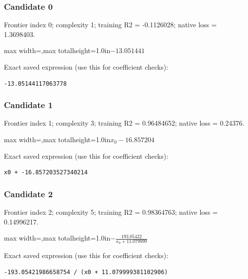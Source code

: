 \documentclass[10pt,letterpaper,landscape]{article}
\begin{document}
\subsubsection*{Candidate 0}
Frontier index 0; complexity 1; training R2 = -0.1126028; native loss = 1.3698403.
\begin{center}\begin{adjustbox}{max width=\linewidth,max totalheight=1.0in}$\displaystyle -13.051441$\end{adjustbox}\end{center}
{\scriptsize Exact saved expression (use this for coefficient checks):}
\begin{lstlisting}
-13.05144117063778
\end{lstlisting}
\subsubsection*{Candidate 1}
Frontier index 1; complexity 3; training R2 = 0.96484652; native loss = 0.24376.
\begin{center}\begin{adjustbox}{max width=\linewidth,max totalheight=1.0in}$\displaystyle x_{0} - 16.857204$\end{adjustbox}\end{center}
{\scriptsize Exact saved expression (use this for coefficient checks):}
\begin{lstlisting}
x0 + -16.857203527340214
\end{lstlisting}
\subsubsection*{Candidate 2}
Frontier index 2; complexity 5; training R2 = 0.98364763; native loss = 0.14996217.
\begin{center}\begin{adjustbox}{max width=\linewidth,max totalheight=1.0in}$\displaystyle - \frac{193.05422}{x_{0} + 11.079999}$\end{adjustbox}\end{center}
{\scriptsize Exact saved expression (use this for coefficient checks):}
\begin{lstlisting}
-193.05421986658754 / (x0 + 11.079999381102906)
\end{lstlisting}
\end{document}
